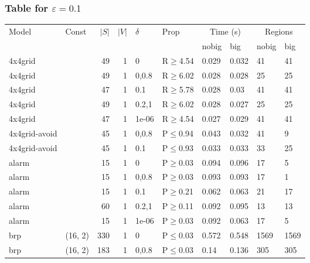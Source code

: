 \subsubsection{Table for \(\varepsilon=0.1\)}
\begin{longtable}{llrrllllll}

        \toprule
        Model & Const & $|S|$ & $|V|$ & $\delta$ & Prop & \multicolumn{2}{c}{Time (s)} & \multicolumn{2}{c}{Regions} \\
        \cmidrule(ll){7-8} \cmidrule(ll){9-10}
        & & & & & & nobig & big & nobig & big \\
        \midrule
        
 4x4grid       &          &     	49 & 1 & 0     & R$\geq$4.54  & 0.029   & 0.032   & 41      & 41   \\
 4x4grid       &          &     	49 & 1 & 0,0.8 & R$\geq$6.02  & 0.028   & 0.028   & 25      & 25   \\
 4x4grid       &          &     	47 & 1 & 0.1   & R$\geq$5.78  & 0.028   & 0.03    & 41      & 41   \\
 4x4grid       &          &     	49 & 1 & 0.2,1 & R$\geq$6.02  & 0.028   & 0.027   & 25      & 25   \\
 4x4grid       &          &     	47 & 1 & 1e-06 & R$\geq$4.54  & 0.027   & 0.029   & 41      & 41   \\
 4x4grid-avoid &          &     	45 & 1 & 0,0.8 & P$\leq$0.94  & 0.043   & 0.032   & 41      & 9    \\
 4x4grid-avoid &          &     	45 & 1 & 0.1   & P$\leq$0.93  & 0.033   & 0.033   & 33      & 25   \\
 alarm         &          &     	15 & 1 & 0     & P$\geq$0.03  & 0.094   & 0.096   & 17      & 5    \\
 alarm         &          &     	15 & 1 & 0,0.8 & P$\geq$0.03  & 0.093   & 0.093   & 17      & 1    \\
 alarm         &          &     	15 & 1 & 0.1   & P$\geq$0.21  & 0.062   & 0.063   & 21      & 17   \\
 alarm         &          &     	60 & 1 & 0.2,1 & P$\geq$0.11  & 0.092   & 0.095   & 13      & 13   \\
 alarm         &          &     	15 & 1 & 1e-06 & P$\geq$0.03  & 0.092   & 0.063   & 17      & 5    \\
 brp           & (16, 2)  &    	330 & 1 & 0     & P$\leq$0.03  & 0.572   & 0.548   & 1569    & 1569 \\
 brp           & (16, 2)  &    	183 & 1 & 0,0.8 & P$\leq$0.03  & 0.14    & 0.136   & 305     & 305  \\

\end{longtable}
